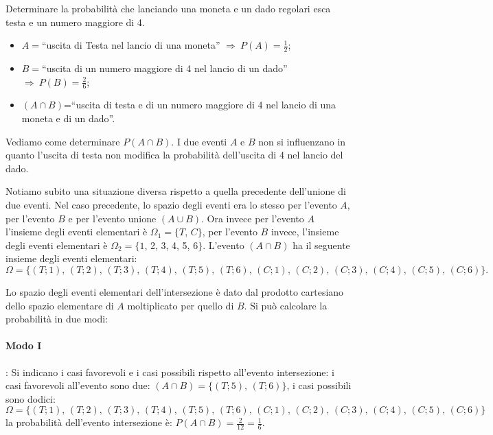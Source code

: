 \begin{exrig}
\begin{esempio}
Determinare la probabilità che lanciando una moneta e un dado regolari esca testa e un numero maggiore di 4.
\begin{itemize}
\item $A=$``uscita di Testa nel lancio di una moneta'' $\Rightarrow\: P(A)=\frac 1 2$;
\item $B=$``uscita di un numero maggiore di 4 nel lancio di un dado'' $\Rightarrow\: P(B)=\frac 2 6$;
\item $(A\cap B)$=``uscita di testa e di un numero maggiore di 4 nel lancio di una moneta e di un dado''.
\end{itemize}
Vediamo come determinare $P(A\cap B)$.
I due eventi $A$ e $B$ non si influenzano in quanto l'uscita di testa non modifica la probabilità dell'uscita di 4 nel lancio del dado.

Notiamo subito una situazione diversa rispetto a quella precedente dell'unione di due eventi. Nel caso precedente, lo spazio degli eventi era lo stesso per l'evento $A$, per l'evento $B$ e per l'evento unione $(A\cup B)$.
Ora invece per l'evento $A$ l'insieme degli eventi elementari è $\Omega_1=\{T$, $C\}$, per l'evento $B$ invece, l'insieme degli eventi elementari è $\Omega_2=\{1$, 2, 3, 4, 5, $6\}$. L'evento $(A\cap B)$ ha il seguente insieme degli eventi elementari: \[\Omega=\{(T;1)\text{, }(T;2)\text{, }(T;3)\text{, }(T;4)\text{, }(T;5)\text{, }(T;6)\text{, }(C;1)\text{, }(C;2)\text{, }(C;3)\text{, }(C;4)\text{, }(C;5)\text{, }(C;6)\}. \]

Lo spazio degli eventi elementari dell'intersezione è dato dal prodotto cartesiano dello spazio elementare di $A$ moltiplicato per quello di $B$. Si può calcolare la probabilità in due modi:
\paragraph{Modo I}: Si indicano i casi favorevoli e i casi possibili rispetto all'evento intersezione: i casi favorevoli all'evento sono due: $(A\cap B)=\{(T;5)\text{, }(T;6)\}$, i casi possibili sono dodici: \[\Omega=\{(T;1)\text{, }(T;2)\text{, }(T;3)\text{, }(T;4)\text{, }(T;5)\text{, }(T;6)\text{, }(C;1)\text{, }(C;2)\text{, }(C;3)\text{, }(C;4)\text{, }(C;5)\text{, }(C;6)\} \] la probabilità dell'evento intersezione è: $P(A\cap B)=\frac 2{12}=\frac 1 6$.

\begin{center}
 
\end{center}


\end{esempio}
\end{exrig}
